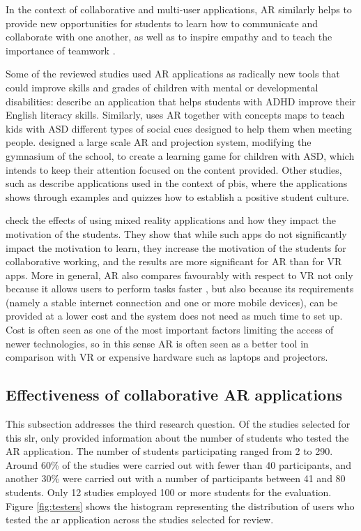In the context of collaborative and multi-user applications, AR similarly helps to provide new opportunities for students to learn how to communicate and collaborate with one another, as well as to inspire empathy and to teach the importance of teamwork \citep{hill2013classroom}.

Some of the reviewed studies used AR applications as radically new tools that could improve skills and grades of children with mental or developmental disabilities: \cite{luna2018words} describe an application that helps students with \gls{ADHD} improve their English literacy skills. Similarly, \cite{chen2019effects} uses AR together with concepts maps to teach kids with \gls{ASD} different types of social cues designed to help them when meeting people. \cite{takahashi2018empathic} designed a large scale AR and projection system, modifying the gymnasium of the school, to create a learning game for children with \gls{ASD}, which intends to keep their attention focused on the content provided. Other studies, such as \cite{dominguez2022collaborative, farella2021augmented, farella2022arete} describe applications used in the context of \gls{pbis}, where the applications shows through examples and quizzes how to establish a positive student culture.

\cite{258-beyoglu2020use} check the effects of using mixed reality applications and how they impact the motivation of the students. They show that while such apps do not significantly impact the motivation to learn, they increase the motivation of the students for collaborative working, and the results are more significant for AR than for \gls{VR} apps. More in general, AR also compares favourably with respect to \gls{VR} not only because it allows users to perform tasks faster \citep{7833028}, but also because its requirements (namely a stable internet connection and one or more mobile devices), can be provided at a lower cost and the system does not need as much time to set up. Cost is often seen as one of the most important factors limiting the access of newer technologies, so in this sense AR is often seen as a better tool in comparison with VR or expensive hardware such as laptops and projectors.

\subsection{Effectiveness of collaborative AR applications}

This subsection addresses the third research question. Of the \papersSelected studies selected for this \gls{slr}, only \papersWithNumStudentInfo provided information about the number of students who tested the AR application. The number of students participating ranged from 2 to 290. Around 60\% of the studies were carried out with fewer than 40 participants, and another 30\% were carried out with a number of participants between 41 and 80 students. Only 12 studies employed 100 or more students for the evaluation. Figure \ref{fig:testers} shows the histogram representing the distribution of users who tested the \gls{ar} application across the studies selected for review.


